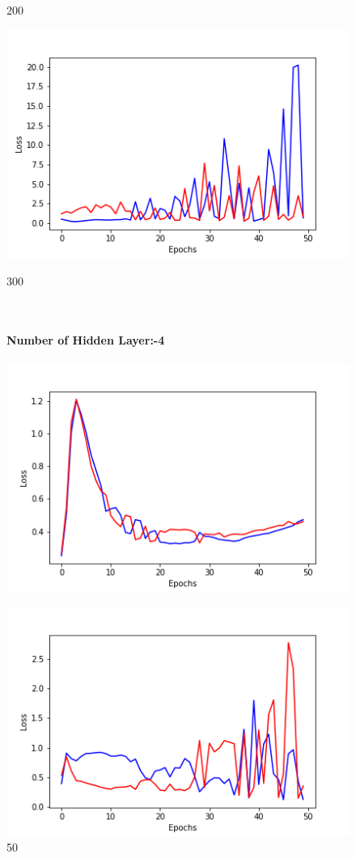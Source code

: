 \documentclass[20pt]{report}
\begin{document}
\begin{figure}[!htb]
	\caption{200}
\endminipage\hfill
{}
  \includegraphics[width=\linewidth]{3_300.png}
	\caption{300}
\endminipage\hfill
\\\\
\textbf{Number of Hidden Layer:-4}\\\\
  \includegraphics[width=\linewidth]{4_50.png}
	\caption{50}
\endminipage\hfill
{}
  \includegraphics[width=\linewidth]{4_100.png}

\end{figure}
\end{document}
